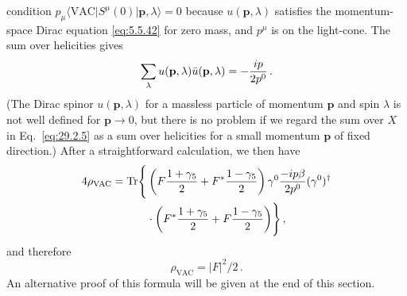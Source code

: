 condition
\(p_\mu\langle\mathrm{VAC}\lvert S^\mu(0)
\rvert\mathbf p,\lambda\rangle=0\) because \(u(\mathbf p,\lambda)\)
satisfies the momentum-space Dirac equation \eqref{eq:5.5.42} for zero
mass, and \(p^\mu\) is on the light-cone. The sum over helicities gives
\[
  \sum_\lambda u(\mathbf p,\lambda)\bar u(\mathbf p,\lambda)
  =-\frac{i\sl{p}}{2p^0}\,.
\]
(The Dirac spinor \(u(\mathbf p,\lambda)\) for a massless particle of
momentum \(\mathbf p\) and spin \(\lambda\) is not well defined for
\(\mathbf p\to0\), but there is no problem if we regard the sum over
\(X\) in Eq.~\eqref{eq:29.2.5} as a sum over helicities for a small
momentum \(\mathbf p\) of fixed direction.) After a straightforward
calculation, we then have
\[
  \begin{aligned}
  4\rho_{\mathrm{VAC}}
  =\operatorname{Tr}\Biggl\{&
    \left(
      F\frac{1+\gamma_5}{2}
      +F^*\frac{1-\gamma_5}{2}
    \right)
    \gamma^0\frac{-i\sl{p}\beta}{2p^0}(\gamma^0)^\dagger
  \\
  &{}\cdot
    \left(
      F^*\frac{1+\gamma_5}{2}
      +F\frac{1-\gamma_5}{2}
    \right)
  \Biggr\}\,,
  \end{aligned}
\]
and therefore
\begin{equation}
  \rho_{\mathrm{VAC}}=\lvert F\rvert^2/2\,.
  \tag{29.2.8}\label{eq:29.2.8}
\end{equation}
An alternative proof of this formula will be given at the end of this
section.

